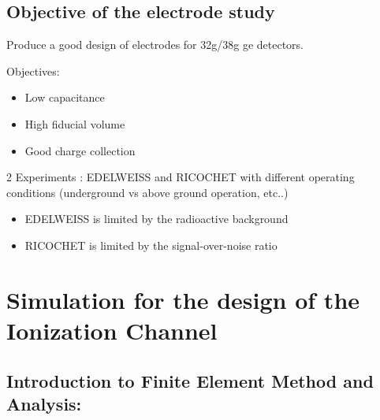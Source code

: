 \subsection{Objective of the electrode study}

Produce a good design of electrodes for 32g/38g ge detectors.

Objectives:
\begin{itemize}
	\item Low capacitance
	\item High fiducial volume
	\item Good charge collection
\end{itemize}

2 Experiments : EDELWEISS and RICOCHET with different operating conditions (underground vs above ground operation, etc..)
\begin{itemize}
	\item EDELWEISS is limited by the radioactive background
	\item RICOCHET is limited by the signal-over-noise ratio
\end{itemize}


\section{Simulation for the design of the Ionization Channel}


\subsection{Introduction to Finite Element Method and Analysis:}


